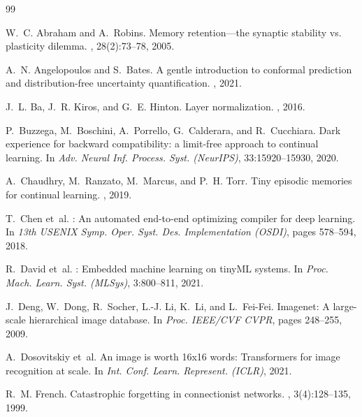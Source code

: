 \documentclass{article}
\begin{document}

\begin{thebibliography}{99}
\fontsize{7.2pt}{8.3pt}\selectfont
\setlength{\itemsep}{0.0pt plus 0.2pt}\setlength{\parskip}{0pt}

W.~C. Abraham and A.~Robins.
\newblock Memory retention---the synaptic stability vs. plasticity dilemma.
, 28(2):73--78, 2005.

A.~N. Angelopoulos and S.~Bates.
\newblock A gentle introduction to conformal prediction and distribution-free uncertainty quantification.
, 2021.

J.~L. Ba, J.~R. Kiros, and G.~E. Hinton.
\newblock Layer normalization.
, 2016.

P.~Buzzega, M.~Boschini, A.~Porrello, G.~Calderara, and R.~Cucchiara.
\newblock Dark experience for backward compatibility: a limit-free approach to continual learning.
\newblock In {\em Adv. Neural Inf. Process. Syst. (NeurIPS)}, 33:15920--15930, 2020.

A.~Chaudhry, M.~Ranzato, M.~Marcus, and P.~H. Torr.
\newblock Tiny episodic memories for continual learning.
, 2019.

T.~Chen et~al.
: An automated end-to-end optimizing compiler for deep learning.
\newblock In {\em 13th USENIX Symp. Oper. Syst. Des. Implementation (OSDI)}, pages 578--594, 2018.

R.~David et~al.
: Embedded machine learning on tiny{ML} systems.
\newblock In {\em Proc. Mach. Learn. Syst. (MLSys)}, 3:800--811, 2021.

J.~Deng, W.~Dong, R.~Socher, L.-J. Li, K.~Li, and L.~Fei-Fei.
\newblock Imagenet: A large-scale hierarchical image database.
\newblock In {\em Proc. IEEE/CVF CVPR}, pages 248--255, 2009.

A.~Dosovitskiy et~al.
\newblock An image is worth 16x16 words: Transformers for image recognition at scale.
\newblock In {\em Int. Conf. Learn. Represent. (ICLR)}, 2021.

R.~M. French.
\newblock Catastrophic forgetting in connectionist networks.
, 3(4):128--135, 1999.


\end{thebibliography}
\end{document}
